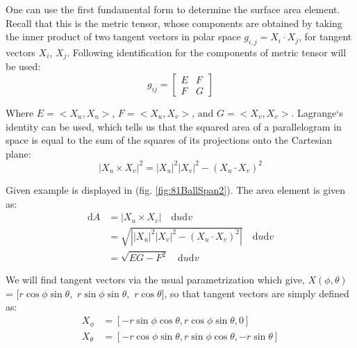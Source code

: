 \noindent One can use the first fundamental form to determine the surface area element. Recall that this is the metric tensor, whose components are obtained by taking the inner product of two tangent vectors in polar space $g_{i,j}= X_i \cdot X_j$, for tangent vectors $X_i$, $X_j$. Following identification for the components of metric tensor will be used:
\begin{equation}\label{eq:metricTensorIdentification}
    g_{ij}=
    \begin{bmatrix}
        E&F\\
        F&G
    \end{bmatrix}
\end{equation}

\noindent Where $E=<X_u,X_u>$, $F=<X_u,X_v>$, and $G=<X_v,X_v>$. Lagrange`s identity can be used, which tells us that the squared area of a parallelogram in space is equal to the sum of the squares of its projections onto the Cartesian plane:
\begin{equation}\label{eq:CartesianProjectionIdentity}
    |X_u \times X_v|^2 = |X_u|^2|X_v|^2 - \left(X_u\cdot X_v\right)^2
\end{equation}

\noindent Given example is displayed in (fig. \ref{fig:81BallSpan2}). The area element is given as:
\begin{equation}\label{eq:squareElementSurfaceDerivation}
    \begin{aligned}
    \text{d}A &= |X_u \times X_v| \quad\text{d}u\text{d}v \\
    & = \sqrt{\left||X_u|^2|X_v|^2 - \left(X_u\cdot X_v\right)^2\right|}\quad \text{d}u\text{d}v\\ 
    & = \sqrt{EG-F^2} \quad \text{d}u\text{d}v
    \end{aligned}
\end{equation}

\noindent We will find tangent vectors via the usual parametrization which give, $X(\phi,\theta)$ = $[r \cos\phi\sin\theta,$ $r\sin\phi\sin\theta,$ $r\cos\theta]$, so that tangent vectors are simply defined as:
\begin{equation}\label{eq:tangentVectorsForPlanarSurface}
    \begin{aligned}
        X_\phi &= [-r\sin\phi\cos\theta,r\cos\phi\sin\theta,0]\\
        X_\theta &=[-r\cos\phi\sin\theta,r\sin\phi\cos\theta,-r\sin\theta]
    \end{aligned}
\end{equation}

